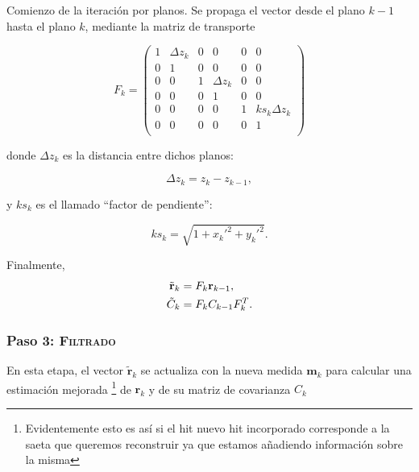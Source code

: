 \documentclass[a4paper]{article}
\let\vec\mathbf  %
\begin{document}
Comienzo de la iteración por planos. Se propaga el vector desde el  plano $k - 1$ hasta el plano $k$, mediante la matriz de transporte

\begin{equation}
F_k = 
\left(
\begin{matrix}
1 & \Delta z_k & 0 & 0    & 0 & 0    \\
0 & 1    & 0 & 0    & 0 & 0     \\
0 & 0    & 1 & \Delta z_k & 0 & 0      \\
0 & 0    & 0 & 1    & 0 & 0       \\
0 & 0    & 0 & 0    & 1 & ks_k \Delta z_k\\
0 & 0    & 0 & 0    & 0 & 1         \\
\end{matrix}\right)
\end{equation}

donde $\Delta z_k$ es la distancia entre dichos planos:

\begin{equation}
\Delta z_k = z_k - z_{k-1},
\label{eq:dz}
\end{equation}

y $ks_k$ es el llamado ``factor de pendiente'':

\begin{equation}
ks_k = \sqrt{1 + x_k'^2 + y_k'^2}.
\label{eq:ks}
\end{equation}

Finalmente,
\begin{align}
\notag
\tilde{\vec{r}}_k &= F_k \vec{r}_{k-1},\\
\tilde{C}_k &= F_k C_{k-1} F_k^T.
\label{eq:pred}
\end{align}

\subsubsection{Paso 3: \textsc{Filtrado}}

En esta etapa, el vector $\tilde{\vec{r}}_k$  se actualiza con la nueva medida $\vec{m}_k$ para calcular una estimación mejorada \footnote{Evidentemente esto es así si el hit nuevo hit incorporado corresponde a la saeta que queremos reconstruir ya que estamos añadiendo información sobre la misma} de $\vec{r}_k$ y de su matriz de covarianza $C_k$
\end{document}
